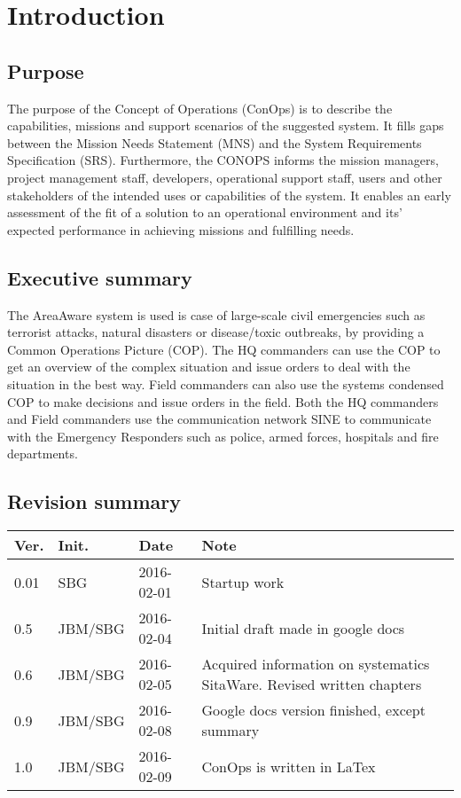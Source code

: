 \chapter{Introduction}
\label{chp_intro}

\section{Purpose}
The purpose of the Concept of Operations (ConOps) is to describe the capabilities, missions and support scenarios of the suggested system. It fills gaps between the Mission Needs Statement (MNS) and the System Requirements Specification (SRS).
Furthermore, the CONOPS informs the mission managers, project management staff, developers, operational support staff, users and other stakeholders of the intended uses or capabilities of the system. It enables an early assessment of the fit of a solution to an operational environment and its’ expected performance in achieving missions and fulfilling needs.

\section{Executive summary}
The AreaAware system is used is case of large-scale civil emergencies such as terrorist attacks, natural disasters or disease/toxic outbreaks, by providing a Common Operations Picture (COP). The HQ commanders can use the COP to get an overview of the complex situation and issue orders to deal with the situation in the best way. Field commanders can also use the systems condensed COP to make decisions and issue orders in the field. Both the HQ commanders and Field commanders use the communication network SINE to communicate with the Emergency Responders such as police, armed forces, hospitals and fire departments. 

\section{Revision summary}

\begin{tabular}{b{1cm} b{2cm} b{2cm} b{7cm}}
    \textbf{Ver.} & \textbf{Init.} & \textbf{Date} & \textbf{Note} \\
    \hline
    0.01 & SBG		& 2016-02-01 & Startup work \\
    0.5  & JBM/SBG	& 2016-02-04 & Initial draft made in google docs \\
    0.6  & JBM/SBG	& 2016-02-05 & Acquired information on systematics SitaWare. Revised written chapters \\
    0.9  & JBM/SBG	& 2016-02-08 & Google docs version finished, except summary \\
    1.0  & JBM/SBG	& 2016-02-09 & ConOps is written in LaTex \\
\end{tabular}
